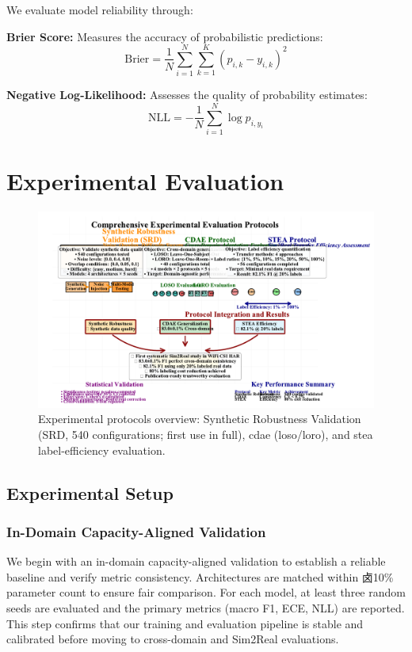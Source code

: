 \documentclass[journal]{IEEEtran}
\begin{document}
We evaluate model reliability through:

\textbf{Brier Score:} Measures the accuracy of probabilistic predictions:
\begin{equation}
\text{Brier} = \frac{1}{N} \sum_{i=1}^{N} \sum_{k=1}^{K} (p_{i,k} - y_{i,k})^2
\end{equation}

\textbf{Negative Log-Likelihood:} Assesses the quality of probability estimates:
\begin{equation}
\text{NLL} = -\frac{1}{N} \sum_{i=1}^{N} \log p_{i,y_i}
\end{equation}

\section{Experimental Evaluation}

\begin{figure}[t]
\centering
\includegraphics[width=\columnwidth]{figures/figure4_experimental_overview.pdf}
\caption{Experimental protocols overview: Synthetic Robustness Validation (SRD, 540 configurations; first use in full), \gls{cdae} (\gls{loso}/\gls{loro}), and \gls{stea} label-efficiency evaluation.}
\label{fig:protocols}
\end{figure}

\subsection{Experimental Setup}

\subsubsection{In-Domain Capacity-Aligned Validation}
We begin with an in-domain capacity-aligned validation to establish a reliable baseline and verify metric consistency. Architectures are matched within 卤10\% parameter count to ensure fair comparison. For each model, at least three random seeds are evaluated and the primary metrics (macro F1, ECE, NLL) are reported. This step confirms that our training and evaluation pipeline is stable and calibrated before moving to cross-domain and Sim2Real evaluations.
\end{document}
